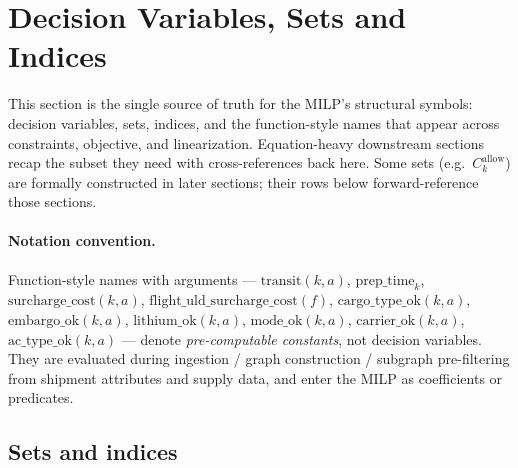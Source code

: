\documentclass[11pt,a4paper]{article}
\theoremstyle{definition}
\begin{document}
\section{Decision Variables, Sets and Indices}
\label{sec:variables}
\label{sec:sets}

This section is the single source of truth for the MILP's structural symbols:
decision variables, sets, indices, and the function-style names that appear
across constraints, objective, and linearization. Equation-heavy downstream
sections recap the subset they need with cross-references back here. Some
sets (e.g.\ $C_k^{\text{allow}}$) are formally constructed in later
sections; their rows below forward-reference those sections.

\paragraph{Notation convention.}
Function-style names with arguments --- $\text{transit}(k, a)$,
$\text{prep\_time}_k$, $\text{surcharge\_cost}(k, a)$,
$\text{flight\_uld\_surcharge\_cost}(f)$, $\text{cargo\_type\_ok}(k, a)$,
$\text{embargo\_ok}(k, a)$, $\text{lithium\_ok}(k, a)$,
$\text{mode\_ok}(k, a)$, $\text{carrier\_ok}(k, a)$,
$\text{ac\_type\_ok}(k, a)$ --- denote \emph{pre-computable constants}, not
decision variables. They are evaluated during ingestion / graph construction /
subgraph pre-filtering from shipment attributes and supply data, and enter
the MILP as coefficients or predicates.

\subsection*{Sets and indices}
\end{document}
